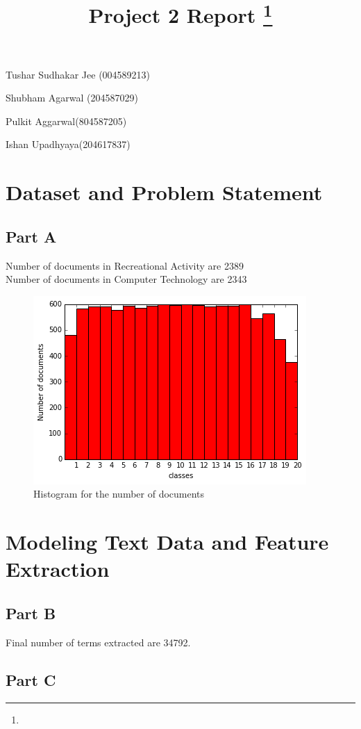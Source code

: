 \documentclass[11pt]{article}
\title{Project 2 Report
\footnote{\s{EE 239AS ; Winter 2016 }
}
}
\begin{document}
\maketitle

Tushar Sudhakar Jee (004589213)

Shubham Agarwal (204587029)

Pulkit Aggarwal(804587205)

Ishan Upadhyaya(204617837)

\section{Dataset and Problem Statement}
\subsection{Part A}
Number of documents in Recreational Activity are 2389\\
Number of documents in Computer Technology are 2343\\

\begin{figure}[H]
	
	\includegraphics[scale =0.7]{histogram.png}
	\caption{Histogram for the number of documents}
\end{figure}


\section{Modeling Text Data and Feature Extraction}
\subsection{Part B}
Final number of terms extracted are 34792.
\subsection{Part C}
\end{document}
